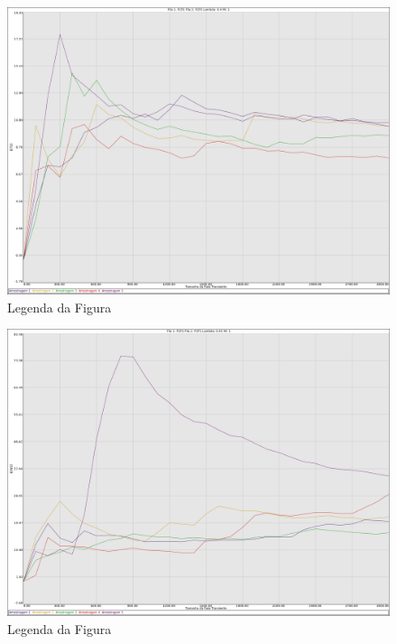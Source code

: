 \documentclass[a4paper,10pt]{article}
\begin{document}
\begin{figure}
	\caption{Legenda da Figura}
	\label{figTransiente3kfila2T}
	\includegraphics[scale = 0.2]{./graficos_transiente_2/01.png}
\end{figure}

\begin{figure}
	\caption{Legenda da Figura}
	\label{figTransiente3kfila2W}
	\includegraphics[scale = 0.2]{./graficos_transiente_2/02.png}
\end{figure}
\end{document}

